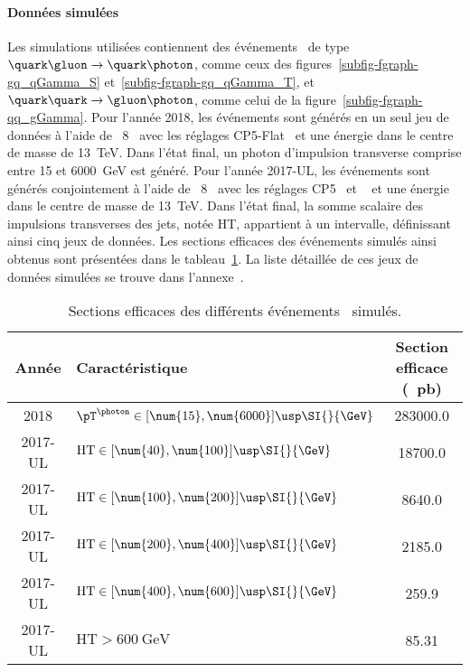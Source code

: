 \paragraph{Données simulées}
Les simulations utilisées contiennent des événements \Gjets\ de type $\quark\gluon\to\quark\photon$, comme ceux des figures~\ref{subfig-fgraph-gq_qGamma_S} et~\ref{subfig-fgraph-gq_qGamma_T}, et $\quark\quark\to\gluon\photon$, comme celui de la figure~\ref{subfig-fgraph-qq_gGamma}.
Pour l'année 2018, les événements sont générés en un seul jeu de données
à l'aide de \PYTHIA~8~\cite{pythia8.2}
avec les réglages CP5-Flat~\cite{tunes_2019}
et une énergie dans le centre de masse de \SI{13}{\TeV}.
Dans l'état final, un photon d'impulsion transverse comprise entre \num{15} et \SI{6000}{\GeV} est généré.
Pour l'année 2017-UL, les événements sont générés conjointement
à l'aide de \PYTHIA~8~\cite{pythia8.2}
avec les réglages CP5~\cite{tunes_2019}
et
\MADGRAPHc~\cite{madgraph5}
et une énergie dans le centre de masse de \SI{13}{\TeV}.
Dans l'état final, la somme scalaire des impulsions transverses des jets, notée HT, appartient à un intervalle, définissant ainsi cinq jeux de données.
Les sections efficaces des événements simulés ainsi obtenus sont présentées dans le tableau~\ref{tab-MC_xsec_2018_and_2017UL_GJet}.
La liste détaillée de ces jeux de données simulées se trouve dans l'annexe~.
\begin{table}[h]
\centering
\begin{tabular}{clc}
\toprule
Année & Caractéristique & Section efficace (\SI{}{\pico\barn})\\
\midrule
2018 & $\pT^{\photon}\in [\num{15}, \num{6000}]\usp\SI{}{\GeV}$ & \num{283000.0}\\
2017-UL & $\text{HT} \in [\num{40}, \num{100}]\usp\SI{}{\GeV}$ & \num{18700.0} \\
2017-UL & $\text{HT} \in [\num{100}, \num{200}]\usp\SI{}{\GeV}$ & \num{8640.0} \\
2017-UL & $\text{HT} \in [\num{200}, \num{400}]\usp\SI{}{\GeV}$ & \num{2185.0} \\
2017-UL & $\text{HT} \in [\num{400}, \num{600}]\usp\SI{}{\GeV}$ & \num{259.9} \\
2017-UL & $\text{HT} > \SI{600}{\GeV}$ & \num{85.31} \\
\bottomrule
\end{tabular}
\caption{Sections efficaces des différents événements \Gjets\ simulés.}
\label{tab-MC_xsec_2018_and_2017UL_GJet}
\end{table}
